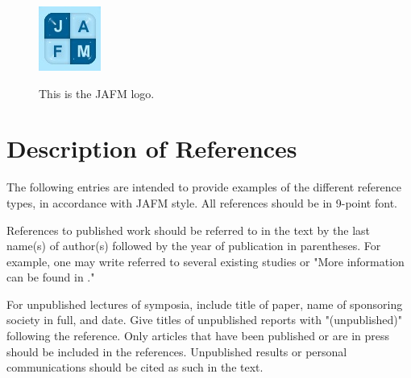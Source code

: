 \documentclass{jafm}
\begin{document}
\begin{figure}
  \centering
  \includegraphics[width=\columnwidth]{LOGO}\\
  \caption[]{ This is the JAFM logo. }
  \label{fig:logo}
\end{figure}
\section{Description of References}
The following entries are intended to provide examples of the different reference types, in accordance with JAFM style. All references should be in 9-point font.

References to published work should be referred to in the text by the last name(s) of author(s) followed by the year of publication in parentheses. For example, one may write 
 referred to several existing studies  
or "More information can be found in ."  

For unpublished lectures of symposia, include title of paper, name of sponsoring society in full, and date.  Give titles of unpublished reports with "(unpublished)" following the reference.  Only articles that have been published or are in press should be included in the references.  Unpublished results or personal communications should be cited as such in the text.
\end{document}
